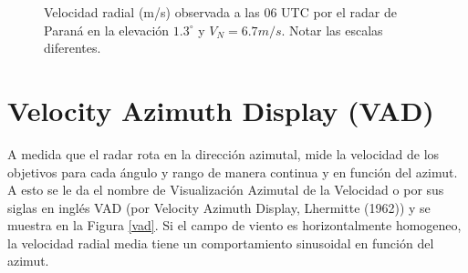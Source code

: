 \documentclass[12pt,spanish,oneside]{book}
\begin{document}
\begin{figure}
\caption{Velocidad radial (m/s) observada a las 06 UTC por el radar de Paraná en la elevación $1.3^{\circ}$ y $V_N = 6.7 m/s$. Notar las escalas diferentes.}\label{fig:aliasing}
\end{figure}

\section{Velocity Azimuth Display
(VAD)}\label{velocity-azimuth-display-vad}

A medida que el radar rota en la dirección azimutal, mide la velocidad
de los objetivos para cada ángulo y rango de manera continua y en
función del azimut. A esto se le da el nombre de Visualización Azimutal
de la Velocidad o por sus siglas en inglés VAD (por Velocity Azimuth
Display, Lhermitte (1962)) y se muestra en la Figura \ref{vad}. Si el
campo de viento es horizontalmente homogeneo, la velocidad radial media
tiene un comportamiento sinusoidal en función del azimut.
\end{document}
